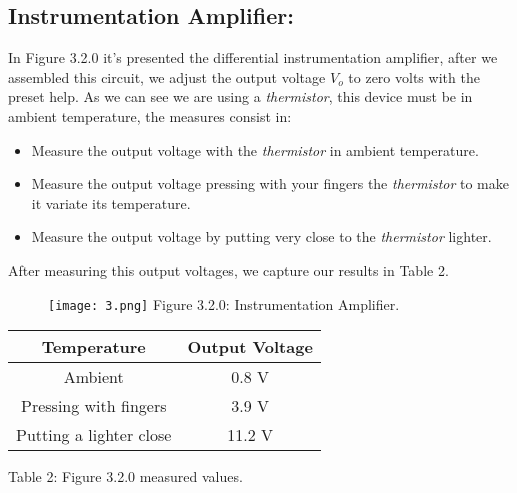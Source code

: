 \subsection{Instrumentation Amplifier:}

In Figure 3.2.0 it's presented the differential instrumentation amplifier, after we assembled this circuit, we adjust the output voltage $V_{o}$ to zero volts with the preset help. As we can see we are using a {\itshape thermistor}, this device must be in ambient temperature, the measures consist in:

\begin{itemize}
\item Measure the output voltage with the {\itshape thermistor} in ambient temperature.
\item Measure the output voltage pressing with your fingers the {\itshape thermistor} to make it variate its temperature.
\item Measure the output voltage by putting very close to the {\itshape thermistor} lighter.
\end{itemize} \hfill

After measuring this output voltages, we capture our results in Table 2. \hfill \break

\begin{figure}[H]
\texttt{[image: 3.png]}
\linebreak \linebreak \centering Figure 3.2.0: Instrumentation Amplifier.
\end{figure} \hfill \break

\begin{center}
\begin{tabular}{c c}
\toprule \toprule
\hspace{80px} Temperature \hspace{80px} & \hspace{80px} Output Voltage \hspace{80px} \\
\midrule \midrule
Ambient & 0.8 V \\
\cmidrule{1-2}
Pressing with fingers & 3.9 V \\
\cmidrule{1-2}
Putting a lighter close & 11.2 V \\
\bottomrule
\end{tabular}
\linebreak \linebreak Table 2: Figure 3.2.0 measured values.
\end{center} \pagebreak

